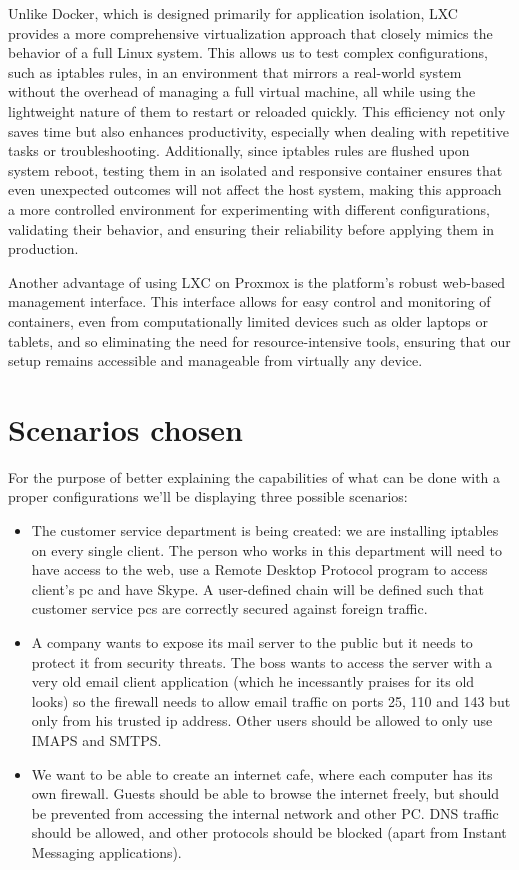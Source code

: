 \documentclass{article}
\begin{document}
Unlike Docker, which is designed primarily for application isolation, LXC provides a more comprehensive virtualization approach that closely mimics the behavior of a full Linux system. This allows us to test complex configurations, such as iptables rules, in an environment that mirrors a real-world system without the overhead of managing a full virtual machine, all while using the lightweight nature of them to restart or reloaded quickly. This efficiency not only saves time but also enhances productivity, especially when dealing with repetitive tasks or troubleshooting. Additionally, since iptables rules are flushed upon system reboot, testing them in an isolated and responsive container ensures that even unexpected outcomes will not affect the host system, making this approach a more controlled environment for experimenting with different configurations, validating their behavior, and ensuring their reliability before applying them in production.

Another advantage of using LXC on Proxmox is the platform’s robust web-based management interface. This interface allows for easy control and monitoring of containers, even from computationally limited devices such as older laptops or tablets, and so eliminating the need for resource-intensive tools, ensuring that our setup remains accessible and manageable from virtually any device.

\section{Scenarios chosen}
For the purpose of better explaining the capabilities of what can be done with a proper configurations we'll be displaying three possible scenarios:
\begin{itemize}
    \item The customer service department is being created: we are installing iptables on every single client. The person who works in this department will need to have access to the web, use a Remote Desktop Protocol program to access client's pc and have Skype. A user-defined chain will be defined such that customer service pcs are correctly secured against foreign traffic.
    \item A company wants to expose its mail server to the public but it needs to protect it from security threats. The boss wants to access the server with a very old email client application (which he incessantly praises for its old looks) so the firewall needs to allow email traffic on ports 25, 110 and 143 but only from his trusted ip address. Other users should be allowed to only use IMAPS and SMTPS.
    \item We want to be able to create an internet cafe, where each computer has its own firewall. Guests should be able to browse the internet freely, but should be prevented from accessing the internal network and other PC. DNS traffic should be allowed, and other protocols should be blocked (apart from Instant Messaging applications).
\end{itemize}
\end{document}
